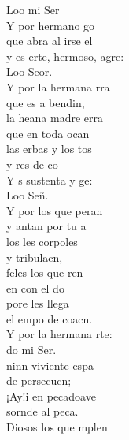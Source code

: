 \documentclass[12pt]{article}
\begin{document}
\begin{multicols*}{2}
\begin{cancion}
	Loo mi Ser\\
	Y por  hermano go\\
	que abra al irse el \\
	y es erte, hermoso, agre:\\
	Loo Seor.\\
\jump
	Y por la hermana rra\\
	que es a bendin, \\
	la heana madre erra\\
	que  en toda ocan \\
	las erbas y los tos \\
	y res de co\\
	Y s sustenta y ge: \\
	Loo Señ. \\
\jump
	Y por los que peran\\
	y antan por tu a\\
	los les corpoles \\
	y  tribulacn,\\
	feles los que ren \\
	en  con el do\\
	pore les llega\\
	el empo de  coacn. \\
\jump
	Y por la hermana rte:\\
	do mi Ser.\\
	ninn viviente espa  \\
	de  persecucn;\\
	¡Ay!i en pecadoave\\
	sornde al peca.\\
	Diosos los que mplen \\

\end{cancion}
\end{multicols*}
\end{document}
